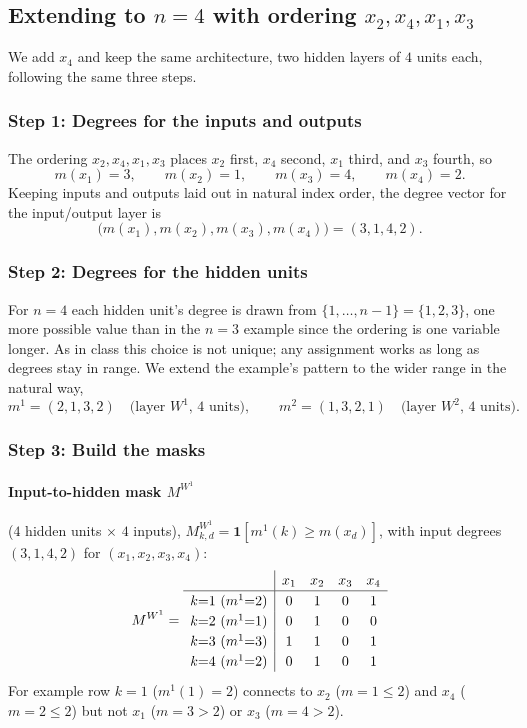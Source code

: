 \documentclass[11pt]{article}
\begin{document}
\subsection*{Extending to $n=4$ with ordering $x_2, x_4, x_1, x_3$}

We add $x_4$ and keep the same architecture, two hidden layers of $4$ units
each, following the same three steps.

\subsubsection*{Step 1: Degrees for the inputs and outputs}

The ordering $x_2, x_4, x_1, x_3$ places $x_2$ first, $x_4$ second, $x_1$ third,
and $x_3$ fourth, so
\[
  m(x_1) = 3, \qquad m(x_2) = 1, \qquad m(x_3) = 4, \qquad m(x_4) = 2.
\]
Keeping inputs and outputs laid out in natural index order, the degree vector
for the input/output layer is
\[
  \big(m(x_1), m(x_2), m(x_3), m(x_4)\big) = (3, 1, 4, 2).
\]

\subsubsection*{Step 2: Degrees for the hidden units}

For $n=4$ each hidden unit's degree is drawn from $\{1, \dots, n-1\} =
\{1,2,3\}$, one more possible value than in the $n=3$ example since the
ordering is one variable longer. As in class this choice is not unique; any
assignment works as long as degrees stay in range. We extend the example's
pattern to the wider range in the natural way,
\[
  m^1 = (2, 1, 3, 2) \quad \text{(layer $W^1$, 4 units)}, \qquad
  m^2 = (1, 3, 2, 1) \quad \text{(layer $W^2$, 4 units)}.
\]

\subsubsection*{Step 3: Build the masks}

\paragraph{Input-to-hidden mask $M^{W^1}$} ($4$ hidden units $\times$ $4$
inputs), $M^{W^1}_{k,d} = \mathbf{1}[m^1(k) \ge m(x_d)]$, with input degrees
$(3,1,4,2)$ for $(x_1,x_2,x_3,x_4)$:
\[
M^{W^1} =
\renewcommand{\arraystretch}{1.2}
\begin{array}{r|cccc}
 & x_1 & x_2 & x_3 & x_4 \\ \hline
  k{=}1\ (m^1{=}2) & 0 & 1 & 0 & 1 \\
  k{=}2\ (m^1{=}1) & 0 & 1 & 0 & 0 \\
  k{=}3\ (m^1{=}3) & 1 & 1 & 0 & 1 \\
  k{=}4\ (m^1{=}2) & 0 & 1 & 0 & 1 \\
\end{array}
\]
For example row $k{=}1$ ($m^1(1)=2$) connects to $x_2$ ($m=1\le 2$) and $x_4$
($m=2\le 2$) but not $x_1$ ($m=3>2$) or $x_3$ ($m=4>2$).
\end{document}
